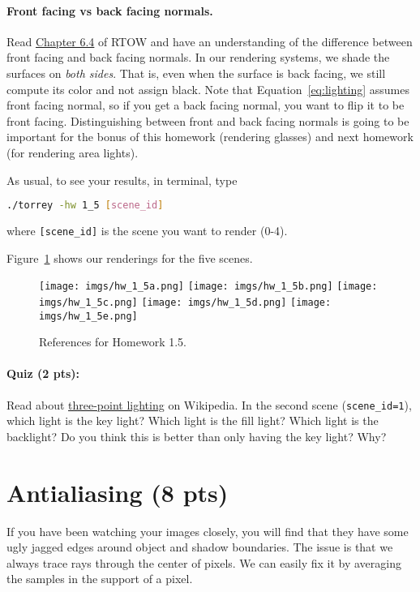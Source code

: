 \paragraph{Front facing vs back facing normals.} Read \href{https://raytracing.github.io/books/RayTracingInOneWeekend.html#surfacenormalsandmultipleobjects/frontfacesversusbackfaces}{Chapter 6.4} of RTOW and have an understanding of the difference between front facing and back facing normals. In our rendering systems, we shade the surfaces on \emph{both sides}. That is, even when the surface is back facing, we still compute its color and not assign black. Note that Equation~\eqref{eq:lighting} assumes front facing normal, so if you get a back facing normal, you want to flip it to be front facing. Distinguishing between front and back facing normals is going to be important for the bonus of this homework (rendering glasses) and next homework (for rendering area lights).

As usual, to see your results, in terminal, type
\begin{lstlisting}[language=bash]
  ./torrey -hw 1_5 [scene_id]
\end{lstlisting}
where \lstinline{[scene_id]} is the scene you want to render (0-4).

Figure~\ref{fig:hw_1_5} shows our renderings for the five scenes.

\begin{figure}[ht]
    \centering
    \texttt{[image: imgs/hw\_1\_5a.png]}
    \texttt{[image: imgs/hw\_1\_5b.png]}
    \texttt{[image: imgs/hw\_1\_5c.png]}
    \texttt{[image: imgs/hw\_1\_5d.png]}
    \texttt{[image: imgs/hw\_1\_5e.png]}
    \caption{References for Homework 1.5.}
    \label{fig:hw_1_5}
\end{figure}

\paragraph{Quiz (2 pts):} Read about \href{https://en.wikipedia.org/wiki/Three-point_lighting}{three-point lighting} on Wikipedia. In the second scene (\lstinline{scene_id=1}), which light is the key light? Which light is the fill light? Which light is the backlight? Do you think this is better than only having the key light? Why?

\section{Antialiasing (8 pts)}
If you have been watching your images closely, you will find that they have some ugly jagged edges around object and shadow boundaries. The issue is that we always trace rays through the center of pixels. We can easily fix it by averaging the samples in the support of a pixel.

